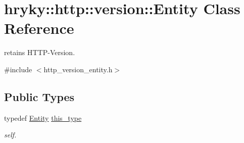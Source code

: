 \hypertarget{classhryky_1_1http_1_1version_1_1_entity}{\section{hryky\-:\-:http\-:\-:version\-:\-:Entity Class Reference}
\label{classhryky_1_1http_1_1version_1_1_entity}
}


retains H\-T\-T\-P-\/\-Version.  




{\ttfamily \#include $<$http\-\_\-version\-\_\-entity.\-h$>$}

\subsection*{Public Types}
\begin{DoxyCompactItemize}
\item 
\hypertarget{classhryky_1_1http_1_1version_1_1_entity_af34c475a16e87fc57803edeec44959de}{typedef \hyperlink{classhryky_1_1http_1_1version_1_1_entity}{Entity} \hyperlink{classhryky_1_1http_1_1version_1_1_entity_af34c475a16e87fc57803edeec44959de}{this\-\_\-type}}\label{classhryky_1_1http_1_1version_1_1_entity_af34c475a16e87fc57803edeec44959de}

\begin{DoxyCompactList}\small\item\em self. \end{DoxyCompactList}\end{DoxyCompactItemize}
